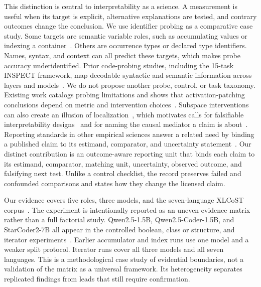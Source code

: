\documentclass{article}
\begin{document}
This distinction is central to interpretability as a science. A measurement is
useful when its target is explicit, alternative explanations are tested, and
contrary outcomes change the conclusion. We use identifier probing as a
comparative case study. Some targets are semantic variable roles, such as
accumulating values or indexing a container~\citep{sajaniemi2002roles}. Others
are occurrence types or declared type identifiers. Names, syntax, and context
can all predict these targets, which makes probe accuracy underidentified.
Prior code-probing studies, including the 15-task INSPECT framework, map
decodable syntactic and semantic information across layers and
models~\citep{karmakar2021what,troshin2022probing,karmakar2024inspect}. We do
not propose another probe, control, or task taxonomy. Existing work catalogs
probing limitations and shows that activation-patching conclusions depend on
metric and intervention choices~\citep{belinkov2022probing,
zhang2023patching,heimersheim2024patching}. Subspace interventions can also
create an illusion of localization~\citep{makelov2023illusion}, which motivates
calls for falsifiable interpretability designs~\citep{leavitt2020falsifiable}
and for naming the causal mediator a claim is about~\citep{mueller2024mediator}.
Reporting standards in other empirical sciences answer a related need by binding
a published claim to its estimand, comparator, and uncertainty
statement~\citep{schulz2010consort}. Our distinct contribution is an
outcome-aware reporting unit that binds each claim to its estimand, comparator,
matching unit, uncertainty, observed outcome, and falsifying next test. Unlike
a control checklist, the record preserves failed and confounded comparisons
and states how they change the licensed claim.

Our evidence covers five roles, three models, and the seven-language XLCoST
corpus~\citep{zhu2022xlcost}. The experiment is intentionally reported as an
uneven evidence matrix rather than a full factorial study. Qwen2.5-1.5B, Qwen2.5-Coder-1.5B, and StarCoder2-7B all appear in the
controlled boolean, class or structure, and iterator
experiments~\citep{qwen2024qwen25,hui2024qwencoder,
lozhkov2024starcoder2}. Earlier accumulator and index runs use one model and a
weaker split protocol. Iterator runs cover all three models and all seven languages.
This is a methodological case study of evidential boundaries, not a validation
of the matrix as a universal framework. Its heterogeneity separates replicated
findings from leads that still require confirmation.
\end{document}
